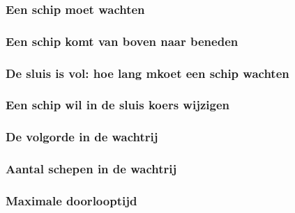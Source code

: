 \subsubsection{Een schip moet wachten}

\subsubsection{Een schip komt van boven naar beneden}

\subsubsection{De sluis is vol: hoe lang mkoet een schip wachten}


\subsubsection{Een schip wil in de sluis koers wijzigen}

\subsubsection{De volgorde in  de wachtrij}


\subsubsection{Aantal schepen in de wachtrij}	

\subsubsection{Maximale doorlooptijd }

